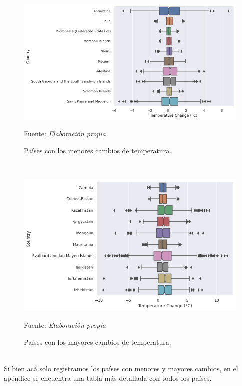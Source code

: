 \documentclass[12pt]{article}
\newcommand{\source}[1]{\caption*{Fuente: {\textit{#1}}} }
\begin{document}
\begin{figure}[H]
    \centering
    \includegraphics[scale=0.5]{fig/fig_7.png}
    \caption{Países con los menores cambios de temperatura.}
    \vspace{-0.3cm}
    \source{Elaboración propia}
    \label{fig:fig_1}
\end{figure}\\
\begin{figure}[H]
    \centering
    \includegraphics[scale=0.5]{fig/fig_8.png}
    \caption{Países con los mayores cambios de temperatura.}
    \vspace{-0.3cm}
    \source{Elaboración propia}
    \label{fig:fig_1}
\end{figure}\\
Si bien acá solo registramos los países con menores y mayores cambios, en el apéndice se encuentra una tabla más detallada con todos los países.
\end{document}

